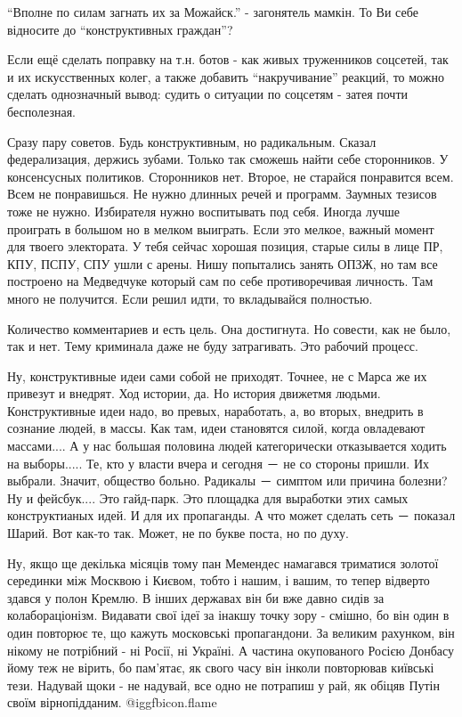\begin{itemize}
\begin{itemize}
\end{itemize} %

\enquote{Вполне по силам загнать их за Можайск.} - загонятель мамкін. То Ви себе відносите до \enquote{конструктивных граждан}?


Если ещё сделать поправку на т.н. ботов - как живых труженников соцсетей, так и
их искусственных колег, а также добавить \enquote{накручивание} реакций, то можно
сделать однозначный вывод: судить о ситуации по соцсетям - затея почти
бесполезная.


Сразу пару советов. Будь конструктивным, но радикальным. Сказал федерализация,
держись зубами. Только так сможешь найти себе сторонников. У консенсусных
политиков. Сторонников нет. Второе, не старайся понравится всем. Всем не
понравишься. Не нужно длинных речей и программ. Заумных тезисов тоже не нужно.
Избирателя нужно воспитывать под себя. Иногда лучше проиграть в большом но в
мелком выиграть. Если это мелкое, важный момент для твоего электората. У тебя
сейчас хорошая позиция, старые силы в лице ПР, КПУ, ПСПУ, СПУ ушли с арены.
Нишу попытались занять ОПЗЖ, но там все построено на Медведчуке который сам по
себе противоречивая личность. Там много не получится. Если решил идти, то
вкладывайся полностью.

Количество комментариев и есть цель. Она достигнута. Но совести, как не было, так и нет.
Тему криминала даже не буду затрагивать. Это рабочий процесс.

Ну, конструктивные идеи сами собой не приходят. Точнее, не с Марса же их привезут и внедрят.
Ход истории, да.
Но история движетмя людьми.
Конструктивные идеи надо, во превых, наработать, а, во вторых, внедрить в сознание людей, в массы.
Как там, идеи становятся силой, когда овладевают массами....
А у нас большая половина людей категорически отказывается ходить на выборы.....
Те, кто у власти вчера и сегодня － не со стороны пришли. Их выбрали.
Значит, общество больно.
Радикалы － симптом или причина болезни?
Ну и фейсбук....
Это гайд-парк.
Это площадка для выработки этих самых конструктианых идей. И для их пропаганды.
А что может сделать сеть － показал Шарий.
Вот как-то так.
Может, не по букве поста, но по духу.


Ну, якщо ще декілька місяців тому пан Мемендес намагався триматися золотої
серединки між Москвою і Києвом, тобто і нашим, і вашим, то тепер відверто
здався у полон Кремлю. В інших державах він би вже давно сидів за
колабораціонізм. Видавати свої ідеї за інакшу точку зору - смішно, бо він один
в один повторює те, що кажуть московські пропагандони. За великим рахунком, він
нікому не потрібний - ні Росії, ні Україні. А частина окупованого Росією
Донбасу йому теж не вірить, бо пам'ятає, як свого часу він інколи повторював
київські тези. Надувай щоки - не надувай, все одно не потрапиш у рай, як обіцяв
Путін своїм вірнопідданим.  @igg{fbicon.flame} 



\end{itemize}

